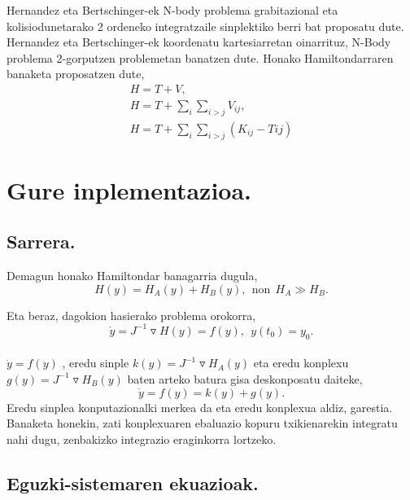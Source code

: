 Hernandez eta Bertschinger-ek  N-body problema grabitazional eta kolisiodunetarako 2 ordeneko integratzaile sinplektiko berri bat proposatu dute. Hernandez eta Bertschinger-ek  koordenatu kartesiarretan oinarrituz, N-Body problema 2-gorputzen problemetan banatzen dute. Honako Hamiltondarraren banaketa proposatzen dute,
\begin{align*}
H=T+V, \\
H=T+ \sum_{i} \sum_{i>j} V_{ij}, \\
H=T+ \sum_{i} \sum_{i>j} (K_{ij}-T{ij})
\end{align*}

\section{Gure inplementazioa.}

\subsection*{Sarrera.}

Demagun honako Hamiltondar banagarria dugula,
\begin{equation*}
H(y)=H_A(y)+H_B(y), \ \  \mbox{non} \ \ H_A \gg H_B.
\end{equation*}

Eta beraz, dagokion hasierako problema orokorra,
\begin{equation*}
\dot{y}=J^{-1}\triangledown H(y)=f(y) , \ \ y(t_0)=y_0.
\end{equation*}

\paragraph*{}$\dot{y}=f(y)$ , eredu sinple $k(y)=J^{-1}\triangledown H_A(y)$ eta eredu konplexu $g(y)=J^{-1}\triangledown H_B(y)$ baten arteko batura gisa deskonposatu daiteke,
\begin{equation*}
\dot{y}=f(y)=k(y)+g(y).
\end{equation*} 
Eredu sinplea konputazionalki merkea da eta eredu konplexua aldiz, garestia. Banaketa honekin, zati konplexuaren ebaluazio kopuru  txikienarekin integratu nahi dugu, zenbakizko integrazio eraginkorra lortzeko.

\subsection*{Eguzki-sistemaren ekuazioak.}

